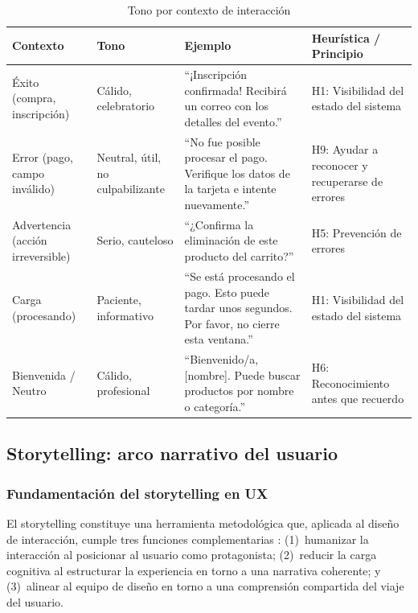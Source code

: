 \documentclass[conference]{IEEEtran}
\begin{document}
\begin{table}[t]
\centering
\caption{Tono por contexto de interacción}
\label{tab:tono}
\renewcommand{\arraystretch}{1.2}
\begin{tabular}{|p{2.5cm}|p{2.2cm}|p{5.5cm}|p{4.5cm}|}
\hline
\textbf{Contexto} & \textbf{Tono} & \textbf{Ejemplo} & \textbf{Heurística / Principio} \\
\hline
Éxito (compra, inscripción) & Cálido, celebratorio & ``¡Inscripción confirmada! Recibirá un correo con los detalles del evento.'' & H1: Visibilidad del estado del sistema \\
\hline
Error (pago, campo inválido) & Neutral, útil, no culpabilizante & ``No fue posible procesar el pago. Verifique los datos de la tarjeta e intente nuevamente.'' & H9: Ayudar a reconocer y recuperarse de errores \\
\hline
Advertencia (acción irreversible) & Serio, cauteloso & ``¿Confirma la eliminación de este producto del carrito?'' & H5: Prevención de errores \\
\hline
Carga (procesando) & Paciente, informativo & ``Se está procesando el pago. Esto puede tardar unos segundos. Por favor, no cierre esta ventana.'' & H1: Visibilidad del estado del sistema \\
\hline
Bienvenida / Neutro & Cálido, profesional & ``Bienvenido/a, [nombre]. Puede buscar productos por nombre o categoría.'' & H6: Reconocimiento antes que recuerdo \\
\hline
\end{tabular}
\end{table}

\subsection{Storytelling: arco narrativo del usuario}

\subsubsection{Fundamentación del storytelling en UX}

El storytelling constituye una herramienta metodológica que, aplicada al diseño de interacción, cumple tres funciones complementarias \cite{storytelling-ux}: (1)~humanizar la interacción al posicionar al usuario como protagonista; (2)~reducir la carga cognitiva al estructurar la experiencia en torno a una narrativa coherente; y (3)~alinear al equipo de diseño en torno a una comprensión compartida del viaje del usuario.
\end{document}
